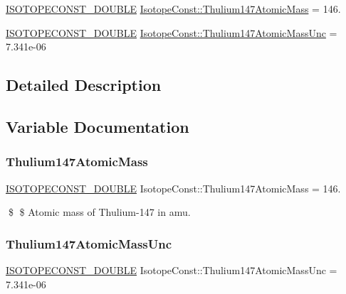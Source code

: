 \begin{DoxyCompactItemize}
\item 
\mbox{\hyperlink{group___isotope_const-_macros_ga8f45a7272ce02c0b4c65c44636ed719a}{I\+S\+O\+T\+O\+P\+E\+C\+O\+N\+S\+T\+\_\+\+D\+O\+U\+B\+LE}} \mbox{\hyperlink{group___isotope_const-_thulium-_tm147_ga1062e026116a93a16948d20b885e73a4}{Isotope\+Const\+::\+Thulium147\+Atomic\+Mass}} = 146.
\item 
\mbox{\hyperlink{group___isotope_const-_macros_ga8f45a7272ce02c0b4c65c44636ed719a}{I\+S\+O\+T\+O\+P\+E\+C\+O\+N\+S\+T\+\_\+\+D\+O\+U\+B\+LE}} \mbox{\hyperlink{group___isotope_const-_thulium-_tm147_ga34d35814a800333830c705eb554ec138}{Isotope\+Const\+::\+Thulium147\+Atomic\+Mass\+Unc}} = 7.\+341e-\/06
\end{DoxyCompactItemize}


\subsection{Detailed Description}


\subsection{Variable Documentation}
\mbox{\label{group___isotope_const-_thulium-_tm147_ga1062e026116a93a16948d20b885e73a4}} 
\subsubsection{\texorpdfstring{Thulium147\+Atomic\+Mass}{Thulium147AtomicMass}}
{\footnotesize\ttfamily \mbox{\hyperlink{group___isotope_const-_macros_ga8f45a7272ce02c0b4c65c44636ed719a}{I\+S\+O\+T\+O\+P\+E\+C\+O\+N\+S\+T\+\_\+\+D\+O\+U\+B\+LE}} Isotope\+Const\+::\+Thulium147\+Atomic\+Mass = 146.}

\$ \$ Atomic mass of Thulium-\/147 in amu. \mbox{\label{group___isotope_const-_thulium-_tm147_ga34d35814a800333830c705eb554ec138}} 
\subsubsection{\texorpdfstring{Thulium147\+Atomic\+Mass\+Unc}{Thulium147AtomicMassUnc}}
{\footnotesize\ttfamily \mbox{\hyperlink{group___isotope_const-_macros_ga8f45a7272ce02c0b4c65c44636ed719a}{I\+S\+O\+T\+O\+P\+E\+C\+O\+N\+S\+T\+\_\+\+D\+O\+U\+B\+LE}} Isotope\+Const\+::\+Thulium147\+Atomic\+Mass\+Unc = 7.\+341e-\/06}

